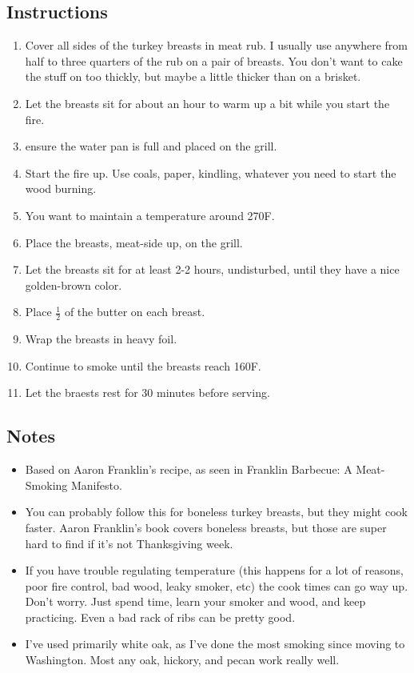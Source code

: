 \begin{multicols}{2}
\subsection*{Instructions}
\begin{enumerate}
    \item Cover all sides of the turkey breasts in meat rub. I usually use anywhere from half to three quarters of the rub on a pair of breasts. You don't want to cake the stuff on too thickly, but maybe a little thicker than on a brisket.
    \item Let the breasts sit for about an hour to warm up a bit while you start the fire.
    \item ensure the water pan is full and placed on the grill.
    \item Start the fire up. Use coals, paper, kindling, whatever you need to start the wood burning.
    \item You want to maintain a temperature around 270F.
    \item Place the breasts, meat-side up, on the grill.
    \item Let the breasts sit for at least 2-2 hours, undisturbed, until they have a nice golden-brown color.
    \item Place \( \frac{1}{2} \) of the butter on each breast.
    \item Wrap the breasts in heavy foil.
    \item Continue to smoke until the breasts reach 160F.
    \item Let the braests rest for 30 minutes before serving.
\end{enumerate}

\subsection*{Notes}
\begin{itemize}
    \item Based on Aaron Franklin's recipe, as seen in Franklin Barbecue: A Meat-Smoking Manifesto.
    \item You can probably follow this for boneless turkey breasts, but they might cook faster. Aaron Franklin's book covers boneless breasts, but those are super hard to find if it's not Thanksgiving week.
    \item If you have trouble regulating temperature (this happens for a lot of reasons, poor fire control, bad wood, leaky smoker, etc) the cook times can go way up. Don't worry. Just spend time, learn your smoker and wood, and keep practicing. Even a bad rack of ribs can be pretty good.
    \item I've used primarily white oak, as I've done the most smoking since moving to Washington. Most any oak, hickory, and pecan work really well.
\end{itemize}
\end{multicols}
\clearpage